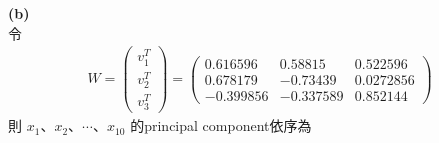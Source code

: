 \documentclass{article}
\begin{document}
\noindent
{\bf (b)}\\

\noindent
令
\begin{align*}
    W = \left(
    \begin{array}{c}
        v_1^T\\
        v_2^T\\
        v_3^T
    \end{array}
    \right)
    = \left(
    \begin{array}{ccc}
        0.616596 & 0.58815 & 0.522596\\
        0.678179 & -0.73439 & 0.0272856\\
        -0.399856 & -0.337589 & 0.852144
    \end{array}
    \right)
\end{align*}
則 $x_1$、$x_2$、$\cdots$、$x_{10}$ 的principal component依序為
\end{document}
